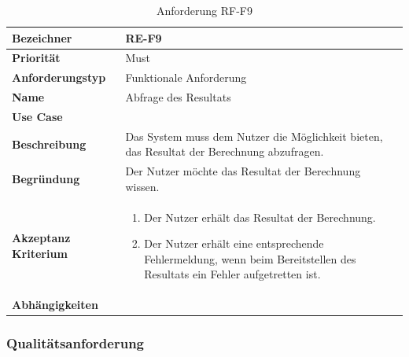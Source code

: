 \begin{table}[ht]
\centering
  \begin{tabular}{ l | p{8cm} }
	\hline
	\rowcolor{gray}
	\textbf{Bezeichner}&	\textbf{RE-F9}\\ \hline
	\textbf{Priorität} 		&	Must\\ \hline
	\textbf{Anforderungstyp}	&	Funktionale Anforderung\\ \hline
	\textbf{Name} 			&	Abfrage des Resultats\\ \hline
	\textbf{Use Case} 		&	\nameref{table:use_case_6}\\ \hline
	\textbf{Beschreibung} 	&	Das System muss dem Nutzer die Möglichkeit bieten, das Resultat der Berechnung abzufragen.\\ \hline
	\textbf{Begründung} 		&	Der Nutzer möchte das Resultat der Berechnung wissen.\\ \hline
	\textbf{Akzeptanz Kriterium}	&	\begin{enumerate}
					\item Der Nutzer erhält das Resultat der Berechnung.
					\item Der Nutzer erhält eine entsprechende Fehlermeldung, wenn beim Bereitstellen des Resultats ein Fehler aufgetretten ist.
					\end{enumerate}
					\\ \hline
	\textbf{Abhängigkeiten} 	&	\nameref{table:req_2}\\ \hline
  \end{tabular}
   \caption{Anforderung RF-F9}\label{table:req_9}
\end{table}

\newpage
\FloatBarrier
\subsubsection{Qualitätsanforderung}\label{non_func_anforderungen}

